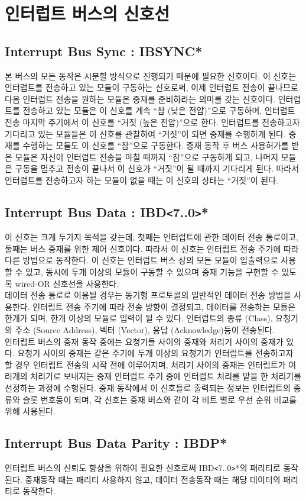 \section{인터럽트 버스의 신호선}
%

%
%
\subsection{Interrupt Bus Sync : IBSYNC*}
본 버스의 모든 동작은 시분할 방식으로 진행되기 때문에 필요한 신호이다.
이 신호는 인터럽트를 전송하고 있는 모듈이 구동하는 신호로써, 
이제 인터럽트 전송이 끝나므로 다음 인터럽트 전송을 원하는 모듈은 중재를 준비하라는 의미를 갖는 신호이다.
인터럽트를 전송하고 있는 모듈은 이 신호를 계속 ``참 (낮은 전압)''으로
구동하며, 인터럽트 전송 마지막 주기에서 이 신호를 ``거짓 (높은 전압)''으로 한다.
인터럽트를 전송하고자 기다리고 있는 모듈들은 이 신호를 관찰하여 ``거짓''이 되면
중재를 수행하게 된다. 중재를 수행하는 모듈도 이 신호를 ``참''으로 구동한다.
중재 동작 후 버스 사용허가를 받은 모듈은 자신이 인터럽트 전송을 마칠 때까지 ``참''으로 구동하게 되고,
나머지 모듈은 구동을 멈추고 전송이 끝나서 이 신호가 ``거짓''이 될 때까지 기다리게 된다.
따라서 인터럽트를 전송하고자 하는 모듈이 없을 때는 이 신호의 상태는 ``거짓''이 된다.
%
\subsection{Interrupt Bus Data : IBD{\tt <}7..0{\tt >}*}
이 신호는 크게 두가지 목적을 갖는데, 첫째는 인터럽트에 관한 데이터 
전송 통로이고, 둘째는 버스 중재를 위한 제어 신호이다.
따라서 이 신호는 인터럽트 전송 주기에 따라 다른 방법으로 동작한다.
이 신호는 인터럽트 버스 상의 모든 모듈이 입출력으로 사용할 수 있고,
동시에 두개 이상의 모듈이 구동할 수 있으며 중재 기능을 구현할 수 있도록
wired-OR 신호선을 사용한다. \\
데이터 전송 통로로 이용될 경우는 동기형 프로토콜의 일반적인 데이터 전송 방법을 사용한다.
인터럽트 전송 주기에 따라 전송 방향이 결정되고, 데이터를 전송하는 모듈은
한개가 되며, 한개 이상의 모듈로 입력이 될 수 있다.
인터럽트의 종류 (Class), 요청기의 주소 (Source Address), 
벡터 (Vector), 응답 (Acknowledge)등이 전송된다. \\
인터럽트 버스의 중재 동작 중에는 요청기들 사이의 중재와 처리기 사이의 중재가 있다.
요청기 사이의 중재는 같은 주기에 두개 이상의 요청기가 인터럽트를 전송하고자 할 경우 
인터럽트 전송의 시작 전에 이루어지며,
처리기 사이의 중재는 인터럽트가 여러개의 처리기로 보내지는 중재 인터럽트 주기 중에 
인터럽트 처리를 맡을 한 처리기를 선정하는 과정에 수행된다.
중재 동작에서 이 신호들로 출력되는 정보는 인터럽트의 종류와 슬롯 번호등이 되며,
각 신호는 중재 버스와 같이 각 비트 별로 우선 순위 비교를 위해 사용된다.
%
\subsection{Interrupt Bus Data Parity : IBDP*}
인터럽트 버스의 신뢰도 향상을 위하여 필요한 신호로써
IBD{\tt <}7..0{\tt >}*의 패리티로 동작된다.
중재동작 때는 패리티 사용하지 않고, 데이터 전송동작 때는 해당 데이터의 패리티로 동작한다.
